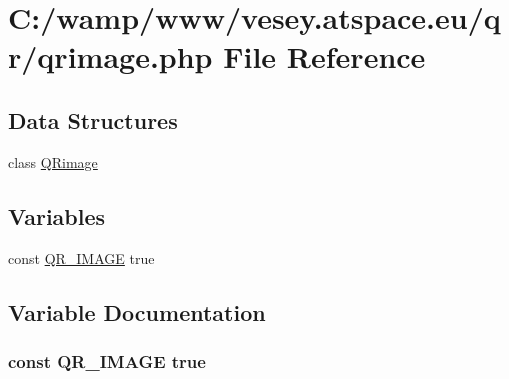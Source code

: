 \hypertarget{qrimage_8php}{\section{C\-:/wamp/www/vesey.atspace.\-eu/qr/qrimage.php File Reference}
\label{qrimage_8php}
}
\subsection*{Data Structures}
\begin{DoxyCompactItemize}
\item 
class \hyperlink{class_q_rimage}{Q\-Rimage}
\end{DoxyCompactItemize}
\subsection*{Variables}
\begin{DoxyCompactItemize}
\item 
const \hyperlink{qrimage_8php_a25bb6537a534661e8975bbf6026805c7}{Q\-R\-\_\-\-I\-M\-A\-G\-E} true
\end{DoxyCompactItemize}


\subsection{Variable Documentation}
\hypertarget{qrimage_8php_a25bb6537a534661e8975bbf6026805c7}{
\subsubsection[{Q\-R\-\_\-\-I\-M\-A\-G\-E}]{\setlength{\rightskip}{0pt plus 5cm}const Q\-R\-\_\-\-I\-M\-A\-G\-E true}}\label{qrimage_8php_a25bb6537a534661e8975bbf6026805c7}
